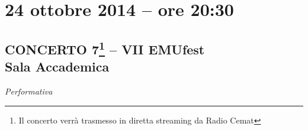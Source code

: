 \documentclass[9pt, twoside, a5paper]{extreport}
\begin{document}
\clearpage



\section*{24 ottobre 2014 -- ore 20:30}
\subsection*{{\small CONCERTO 7\footnote{{\normalsize Il concerto verrà trasmesso in diretta streaming da Radio Cemat}} -- VII EMUfest\\}\textsf{Sala Accademica\\}}

{\fontsize{30}{30}\selectfont \textit{Performativa}}


\bigskip
\end{document}
